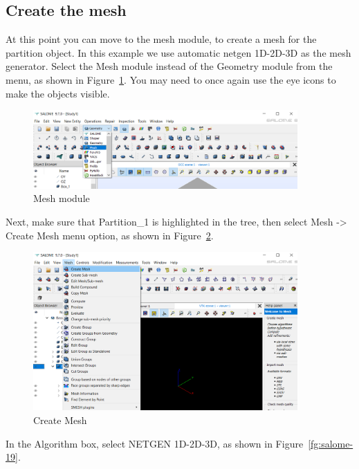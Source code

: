\subsection{Create the mesh}

At this point you can move to the mesh module, to create a mesh for the partition object.  In this example we use automatic netgen 1D-2D-3D as the mesh generator.  Select the Mesh module instead of the Geometry module from the menu, as shown in Figure~\ref{fg:salome-17}.  You may need to once again use the eye icons to make the objects visible.

\begin{figure}[H]
\centering
\includegraphics[width=0.9\textwidth]{Salome-17}
\caption{Mesh module}\label{fg:salome-17}
\end{figure}

Next, make sure that Partition\_1 is highlighted in the tree, then select Mesh -> Create Mesh menu option, as shown in Figure~\ref{fg:salome-18}.

\begin{figure}[H]
\centering
\includegraphics[width=0.9\textwidth]{Salome-18}
\caption{Create Mesh}\label{fg:salome-18}
\end{figure}

In the Algorithm box, select NETGEN 1D-2D-3D, as shown in Figure~\ref{fg:salome-19}.


